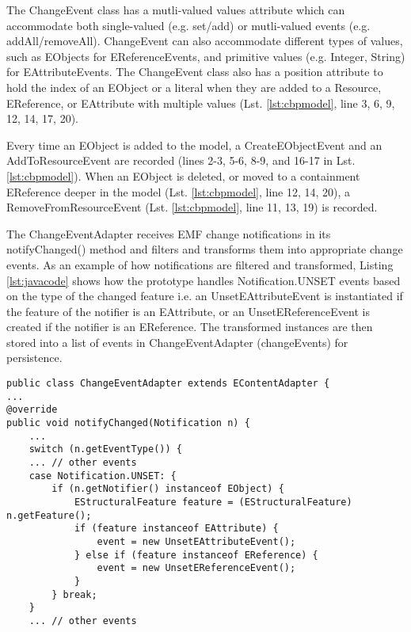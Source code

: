 The \textsf{ChangeEvent} class has a mutli-valued \textsf{values} attribute which can accommodate both single-valued (e.g. set/add) or mutli-valued events (e.g. addAll/removeAll). \textsf{ChangeEvent} can also accommodate different types of values, such as \textsf{EObject}s for \textsf{EReferenceEvents}, and primitive values (e.g. Integer, String) for \textsf{EAttributeEvents}. The \textsf{ChangeEvent} class also has a position attribute to hold the  index of an \textsf{EObject} or a literal when they are added to a \textsf{Resource}, \textsf{EReference}, or \textsf{EAttribute} with multiple values (Lst. \ref{lst:cbpmodel}, line 3, 6, 9, 12, 14, 17, 20). 

Every time an \textsf{EObject} is added to the model, a \textsf{CreateEObjectEvent} and an \textsf{AddToResourceEvent} are recorded (lines 2-3, 5-6, 8-9, and 16-17 in Lst. \ref{lst:cbpmodel}). When an EObject is deleted, or moved to a containment \textsf{EReference} deeper in the model (Lst. \ref{lst:cbpmodel}, line 12, 14, 20), a \textsf{RemoveFromResourceEvent} (Lst. \ref{lst:cbpmodel}, line 11, 13, 19) is recorded.

The \textsf{ChangeEventAdapter} receives EMF change notifications in its \textsf{notifyChanged()} method and filters and transforms them into appropriate change events. As an example of how notifications are filtered and transformed, Listing \ref{lst:javacode} shows how the prototype handles \textsf{Notification.UNSET} events based on the type of the changed feature i.e. an \textsf{UnsetEAttributeEvent} is instantiated if the feature of the notifier is an \textsf{EAttribute}, or an \textsf{UnsetEReferenceEvent}  is created if the notifier is an \textsf{EReference}. The transformed instances are then stored into a list of events in \textsf{ChangeEventAdapter} (\textsf{changeEvents}) for persistence. 

\begin{lstlisting}[style=java,caption={Simplified Java code to handle notification events.},label=lst:javacode]
public class ChangeEventAdapter extends EContentAdapter {
...
@override
public void notifyChanged(Notification n) {
    ...
    switch (n.getEventType()) {
    ... // other events
    case Notification.UNSET: {
        if (n.getNotifier() instanceof EObject) {
            EStructuralFeature feature = (EStructuralFeature) n.getFeature();
            if (feature instanceof EAttribute) {
                event = new UnsetEAttributeEvent();
            } else if (feature instanceof EReference) {
                event = new UnsetEReferenceEvent();
            }
        } break;
    } 
    ... // other events
\end{lstlisting}	

